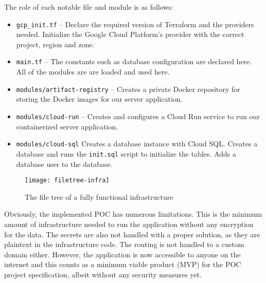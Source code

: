 
The role of each notable file and module is as follows:
\begin{itemize}
    \item
    \texttt{gcp\_init.tf} –
    Declare the required version of Terraform and the providers needed.
    Initialize the Google Cloud Platform's provider with the correct project, region and zone.
    \item
    \texttt{main.tf} –
    The constants such as database configuration are declared here.
    All of the modules are are loaded and used here.
    \item
    \texttt{modules/artifact-registry} –
    Creates a private Docker repository for storing the Docker images for our server application.
    \item
    \texttt{modules/cloud-run} –
    Creates and configures a Cloud Run service to run our containerized server application. 
    \item
    \texttt{modules/cloud-sql}
    Creates a database instance with Cloud SQL.
    Creates a database and runs the \texttt{init.sql} script to initialize the tables.
    Adds a database user to the database.
\end{itemize}

\begin{figure}[h!]
\centering
\texttt{[image: filetree-infra]}
\caption{The file tree of a fully functional infrastructure}
\label{fig:filetree-infra}
\end{figure}

Obviously, the implemented POC has numerous limitations.
This is the minimum amount of infrastructure needed to run the application without any encryption for the data.
The secrets are also not handled with a proper solution, as they are plaintext in the infrastructure code.
The routing is not handled to a custom domain either.
However, the application is now accessible to anyone on the internet and this counts as a minimum viable product (MVP) for the POC project specification, albeit without any security measures yet.

